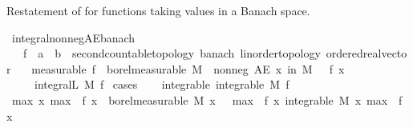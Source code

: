 \begin{isabellebody}
\isamarkupfalse%
%
\endisatagproof
{\isafoldproof}%
%
\isadelimproof
%
\endisadelimproof
%
\begin{isamarkuptext}%
Restatement of  for functions taking values in a Banach space.%
\end{isamarkuptext}\isamarkuptrue%
\isamarkupfalse%
\ integral{\isacharunderscore}{\kern0pt}nonneg{\isacharunderscore}{\kern0pt}AE{\isacharunderscore}{\kern0pt}banach{\isacharcolon}{\kern0pt}\ \ \ \ \ \ \ \ \ \ \ \ \ \ \ \ \ \ \ \ \ \ \ \ \isanewline
\ \ \ f\ {\isacharcolon}{\kern0pt}{\isacharcolon}{\kern0pt}\ {\isachardoublequoteopen}{\isacharprime}{\kern0pt}a\ {\isasymRightarrow}\ {\isacharprime}{\kern0pt}b\ {\isacharcolon}{\kern0pt}{\isacharcolon}{\kern0pt}\ {\isacharbraceleft}{\kern0pt}second{\isacharunderscore}{\kern0pt}countable{\isacharunderscore}{\kern0pt}topology{\isacharcomma}{\kern0pt}\ banach{\isacharcomma}{\kern0pt}\ linorder{\isacharunderscore}{\kern0pt}topology{\isacharcomma}{\kern0pt}\ ordered{\isacharunderscore}{\kern0pt}real{\isacharunderscore}{\kern0pt}vector{\isacharbraceright}{\kern0pt}{\isachardoublequoteclose}\isanewline
\ \ \ {\isacharbrackleft}{\kern0pt}measurable{\isacharbrackright}{\kern0pt}{\isacharcolon}{\kern0pt}\ {\isachardoublequoteopen}f\ {\isasymin}\ borel{\isacharunderscore}{\kern0pt}measurable\ M{\isachardoublequoteclose}\ \ nonneg{\isacharcolon}{\kern0pt}\ {\isachardoublequoteopen}AE\ x\ in\ M{\isachardot}{\kern0pt}\ {}\ {\isasymle}\ f\ x{\isachardoublequoteclose}\isanewline
\ \ \ {\isachardoublequoteopen}{}\ {\isasymle}\ integral\isactrlsup L\ M\ f{\isachardoublequoteclose}\isanewline
%
\isadelimproof
%
\endisadelimproof
%
\isatagproof
{}\isamarkupfalse%
\ cases\isanewline
\ \ \isamarkupfalse%
\ integrable{\isacharcolon}{\kern0pt}\ {\isachardoublequoteopen}integrable\ M\ f{\isachardoublequoteclose}\isanewline
\ \ \isamarkupfalse%
\ max{\isacharcolon}{\kern0pt}\ {\isachardoublequoteopen}{\isacharparenleft}{\kern0pt}{\isasymlambda}x{\isachardot}{\kern0pt}\ max\ {}\ {\isacharparenleft}{\kern0pt}f\ x{\isacharparenright}{\kern0pt}{\isacharparenright}{\kern0pt}\ {\isasymin}\ borel{\isacharunderscore}{\kern0pt}measurable\ M{\isachardoublequoteclose}\ {\isachardoublequoteopen}{\isasymAnd}x{\isachardot}{\kern0pt}\ {}\ {\isasymle}\ max\ {}\ {\isacharparenleft}{\kern0pt}f\ x{\isacharparenright}{\kern0pt}{\isachardoublequoteclose}\ {\isachardoublequoteopen}integrable\ M\ {\isacharparenleft}{\kern0pt}{\isasymlambda}x{\isachardot}{\kern0pt}\ max\ {}\ {\isacharparenleft}{\kern0pt}f\ x{\isacharparenright}{\kern0pt}{\isacharparenright}{\kern0pt}{\isachardoublequoteclose}\ \isamarkupfalse%

\end{isabellebody}
